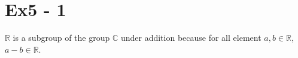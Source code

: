 \section*{Ex5 - 1}

$ \mathbb{R} $ is a subgroup of the group $ \mathbb{C} $ under addition because for all element $ a,b \in \mathbb{R} $, $ a - b \in \mathbb{R} $.